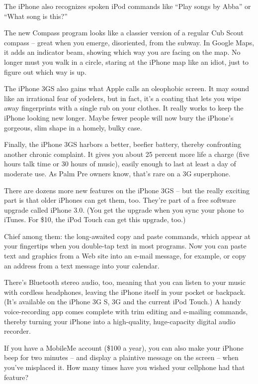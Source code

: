 ﻿\documentclass[12pt,a4paper,onecolumn]{article}
\begin{document}
The iPhone also recognizes spoken iPod commands like ``Play songs by Abba'' or ``What song is
this?''

The new Compass program looks like a classier version of a regular Cub Scout compass -- great when
you emerge, disoriented, from the subway. In Google Maps, it adds an indicator beam, showing which
way you are facing on the map. No longer must you walk in a circle, staring at the iPhone map like
an idiot, just to figure out which way is up.

The iPhone 3GS also gains what Apple calls an oleophobic screen. It may sound like an irrational
fear of yodelers, but in fact, it's a coating that lets you wipe away fingerprints with a single rub
on your clothes. It really works to keep the iPhone looking new longer. Maybe fewer people will now
bury the iPhone's gorgeous, slim shape in a homely, bulky case.

Finally, the iPhone 3GS harbors a better, beefier battery, thereby confronting another chronic
complaint. It gives you about 25 percent more life a charge (five hours talk time or 30 hours of
music), easily enough to last at least a day of moderate use. As Palm Pre owners know, that's rare
on a 3G superphone.

There are dozens more new features on the iPhone 3GS -- but the really exciting part is that older
iPhones can get them, too. They're part of a free software upgrade called iPhone 3.0. (You get the
upgrade when you sync your phone to iTunes. For \$10, the iPod Touch can get this upgrade, too.)

Chief among them: the long-awaited copy and paste commands, which appear at your fingertips when you
double-tap text in most programs. Now you can paste text and graphics from a Web site into an e-mail
message, for example, or copy an address from a text message into your calendar.

There's Bluetooth stereo audio, too, meaning that you can listen to your music with cordless
headphones, leaving the iPhone itself in your pocket or backpack. (It's available on the iPhone 3G
S, 3G and the current iPod Touch.) A handy voice-recording app comes complete with trim editing and
e-mailing commands, thereby turning your iPhone into a high-quality, huge-capacity digital audio
recorder.

If you have a MobileMe account (\$100 a year), you can also make your iPhone beep for two minutes --
and display a plaintive message on the screen -- when you've misplaced it. How many times have you
wished your cellphone had that feature?
\end{document}

